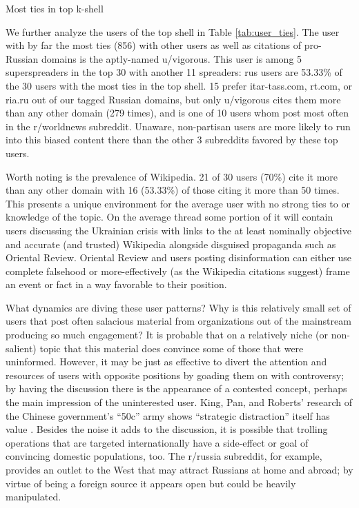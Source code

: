 \begin{table}[!ht]
\footnotesize
\centering
\caption{Most ties in top k-shell}

\label{tab:user_ties}
\end{table}

We further analyze the users of the top shell in Table \ref{tab:user_ties}.
The user with by far the most ties (856) with other users as well as citations of pro-Russian domains is the aptly-named u/vigorous.
This user is among 5 superspreaders in the top 30 with another 11 spreaders: rus users are 53.33\% of the 30 users with the most ties in the top shell.
15 prefer itar-tass.com, rt.com, or ria.ru out of our tagged Russian domains, but only u/vigorous cites them more than any other domain (279 times), and is one of 10 users whom post most often in the r/worldnews subreddit.
Unaware, non-partisan users are more likely to run into this biased content there than the other 3 subreddits favored by these top users.

Worth noting is the prevalence of Wikipedia.
21 of 30 users (70\%) cite it more than any other domain with 16 (53.33\%) of those citing it more than 50 times.
This presents a unique environment for the average user with no strong ties to or knowledge of the topic.
On the average thread some portion of it will contain users discussing the Ukrainian crisis with links to the at least nominally objective and accurate (and trusted) Wikipedia alongside disguised propaganda such as Oriental Review.
Oriental Review and users posting disinformation can either use complete falsehood or more-effectively (as the Wikipedia citations suggest) frame an event or fact in a way favorable to their position.

What dynamics are diving these user patterns?
Why is this relatively small set of users that post often salacious material from organizations out of the mainstream producing so much engagement?
It is probable that on a relatively niche (or non-salient) topic that this material does convince some of those that were uninformed.
However, it may be just as effective to divert the attention and resources of users with opposite positions by goading them on with controversy; by having the discussion there is the appearance of a contested concept, perhaps the main impression of the uninterested user.
King, Pan, and Roberts' research of the Chinese government's ``50c'' army shows ``strategic distraction'' itself has value \cite{king2017}.
Besides the noise it adds to the discussion, it is possible that trolling operations that are targeted internationally have a side-effect or goal of convincing domestic populations, too.
The r/russia subreddit, for example, provides an outlet to the West that may attract Russians at home and abroad; by virtue of being a foreign source it appears open but could be heavily manipulated.

